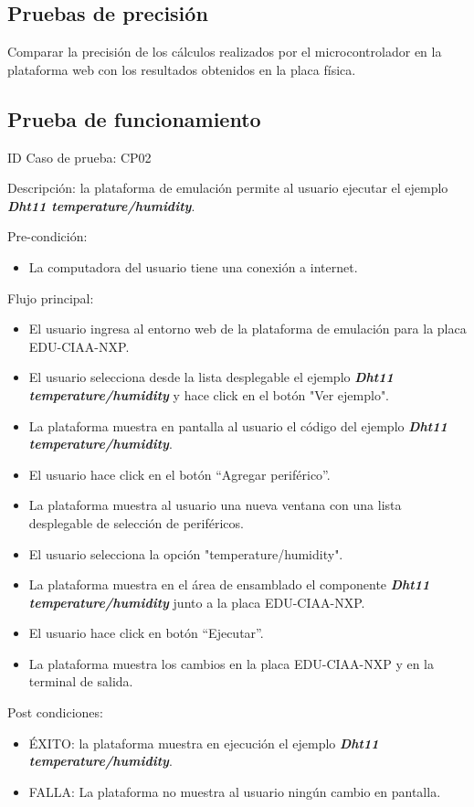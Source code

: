 \hfill \break
\hfill \break

\subsection{Pruebas de precisión}  
Comparar la precisión de los cálculos realizados por el microcontrolador en la plataforma web con los resultados obtenidos en la placa física.

\subsection{Prueba de funcionamiento}    

ID Caso de prueba: CP02 

Descripción: la plataforma de emulación permite al usuario ejecutar el ejemplo \textit{\textbf{Dht11 temperature/humidity}}.

Pre-condición: 
\begin{itemize}
	\item La computadora del usuario tiene una conexión a internet.
\end{itemize}

Flujo principal:
\begin{itemize}
	\item El usuario ingresa al entorno web de la plataforma de emulación para la placa EDU-CIAA-NXP.
	\item El usuario selecciona desde la lista desplegable el ejemplo \textit{\textbf{Dht11 temperature/humidity}} y hace click en el botón "Ver ejemplo".
	\item La plataforma muestra en pantalla al usuario el código del ejemplo \textit{\textbf{Dht11 temperature/humidity}}.
	\item El usuario hace click en el botón “Agregar periférico”.
	\item La plataforma muestra al usuario una nueva ventana con una lista desplegable de selección de  periféricos.
	\item El usuario selecciona la opción "temperature/humidity".
	\item La plataforma muestra en el área de ensamblado el componente \textit{\textbf{Dht11 temperature/humidity}} junto a la placa EDU-CIAA-NXP.
	\item El usuario hace click en botón “Ejecutar”.
	\item La plataforma muestra los cambios en la placa EDU-CIAA-NXP y en la terminal de salida.
\end{itemize}
Post condiciones:
\begin{itemize}
	\item ÉXITO: la plataforma muestra en ejecución el ejemplo \textit{\textbf{Dht11 temperature/humidity}}.
	\item FALLA: La plataforma no muestra al usuario ningún cambio en pantalla.
\end{itemize}

